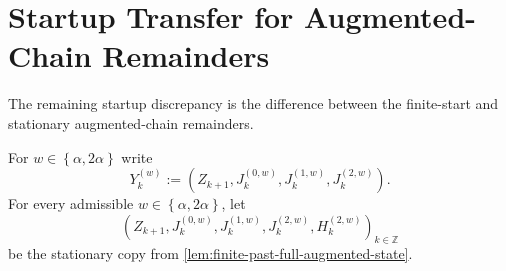 
\section{Startup Transfer for Augmented-Chain Remainders}

The remaining startup discrepancy is the difference between the finite-start
and stationary augmented-chain remainders.

For $w \in \left\{ \alpha, 2 \alpha \right\}$ write
\[
Y_{k}^{(w)} := (Z_{k + 1}, J_{k}^{(0,w)}, J_{k}^{(1,w)}, J_{k}^{(2,w)}).
\]
For every admissible $w \in \left\{ \alpha, 2 \alpha \right\}$, let
\[
(Z_{k + 1}, J_{k}^{(0,w)}, J_{k}^{(1,w)}, J_{k}^{(2,w)}, H_{k}^{(2,w)})_{k \in \mathbb{Z}}
\]
be the stationary copy from \cref{lem:finite-past-full-augmented-state}.

